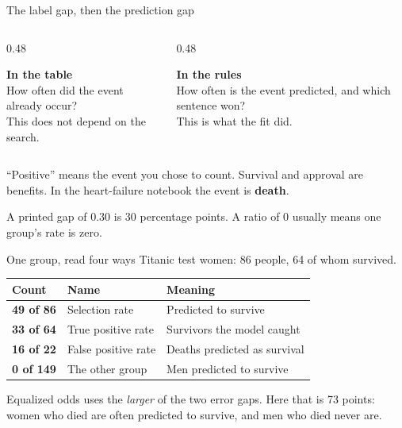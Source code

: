 \documentclass[aspectratio=169,11pt]{beamer}
\begin{document}
\begin{frame}{The label gap, then the prediction gap}
  \begin{columns}[T]
    \begin{column}{0.48\textwidth}
      \colorbox{ebdbluepale}{\parbox[t]{0.92\textwidth}{%
        {\color{ebdnavy}\textbf{In the table}}\\[0.35em]
        How often did the event already occur?\\[0.3em]
        {\small This does not depend on the search.}}}
    \end{column}
    \begin{column}{0.48\textwidth}
      \colorbox{ebdsage}{\parbox[t]{0.92\textwidth}{%
        {\color{ebdgreen}\textbf{In the rules}}\\[0.35em]
        How often is the event predicted, and which sentence won?\\[0.3em]
        {\small This is what the fit did.}}}
    \end{column}
  \end{columns}
  \vspace{0.7em}
  ``Positive'' means the event you chose to count. Survival and approval are benefits. In the heart-failure notebook the event is \textbf{death}.
  \vspace{0.4em}

  {\small A printed gap of \(0.30\) is 30 percentage points. A ratio of 0 usually means one group's rate is zero.}
\end{frame}

\begin{frame}{One group, read four ways}
  Titanic test women: 86 people, 64 of whom survived.
  \vspace{0.4em}

  \renewcommand{\arraystretch}{1.2}
  \begin{tabular}{@{}l l l@{}}
    \toprule
    Count & Name & Meaning \\
    \midrule
    \textbf{49 of 86} & Selection rate & Predicted to survive \\
    \textbf{33 of 64} & True positive rate & Survivors the model caught \\
    \textbf{16 of 22} & False positive rate & Deaths predicted as survival \\
    \textbf{0 of 149} & The other group & Men predicted to survive \\
    \bottomrule
  \end{tabular}

  \vspace{0.45em}
  {\small Equalized odds uses the \emph{larger} of the two error gaps. Here that is 73 points: women who died are often predicted to survive, and men who died never are.}
\end{frame}
\end{document}
